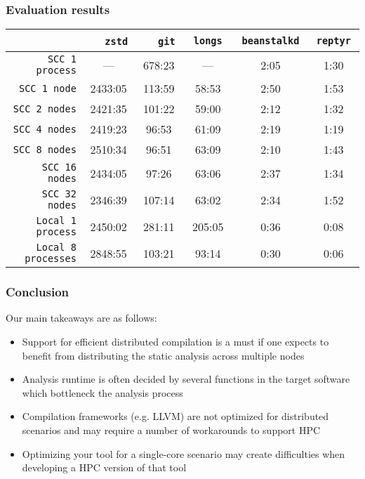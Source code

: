 \begin{frame}
\frametitle{Evaluation results}
\begin{table}[tbh]
\centering
\label{table:projects}
\begin{adjustbox}{width=110mm}
\begin{tabular}{|r|c|c|c|c|c|}
\hline
\           & $\quad$    \texttt{zstd}       $\quad$
            & $\quad$    \texttt{git}        $\quad$
            & $\quad$    \texttt{longs}      $\quad$
            & $\enspace$ \texttt{beanstalkd} $\enspace$
            & $\enspace$ \texttt{reptyr}     $\enspace$ \\ \hline

\texttt{SCC 1 process}
& ---     & 678:23   & ---    & 2:05 & 1:30 \\ \hline
\texttt{SCC 1 node}
& 2433:05 & 113:59   & 58:53  & 2:50 & 1:53 \\ \hline
\texttt{SCC 2 nodes}
& 2421:35 & 101:22   & 59:00  & 2:12 & 1:32 \\ \hline
\texttt{SCC 4 nodes}
& 2419:23 & 96:53    & 61:09  & 2:19 & 1:19 \\ \hline
\texttt{SCC 8 nodes}
& 2510:34 & 96:51    & 63:09  & 2:10 & 1:43 \\ \hline
\texttt{SCC 16 nodes}
& 2434:05 & 97:26    & 63:06  & 2:37 & 1:34 \\ \hline
\texttt{SCC 32 nodes}
& 2346:39 & 107:14   & 63:02  & 2:34 & 1:52 \\ \hline \hline
\texttt{Local 1 process}
& 2450:02 & 281:11   & 205:05 & 0:36 & 0:08 \\ \hline
\texttt{Local 8 processes}
& 2848:55 & 103:21   & 93:14  & 0:30 & 0:06 \\ \hline
\end{tabular}
\end{adjustbox}
\end{table}
\end{frame}


\begin{frame}
\frametitle{Conclusion}
Our main takeaways are as follows:
	\begin{itemize}
		\item Support for efficient distributed compilation is a must if one expects to benefit from distributing the static analysis across multiple nodes
		\item Analysis runtime is often decided by several functions in the target software which bottleneck the analysis process
		\item Compilation frameworks (e.g. LLVM) are not optimized for distributed scenarios and may require a number of workarounds to support HPC
		\item Optimizing your tool for a single-core scenario may create difficulties when developing a HPC version of that tool 
	\end{itemize}
\end{frame}

